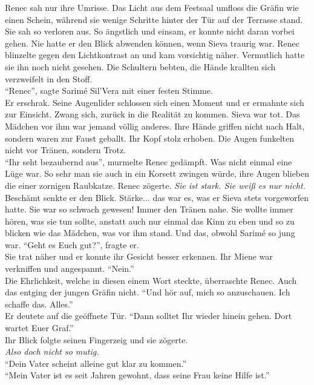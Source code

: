 Renec sah nur ihre Umrisse. Das Licht aus dem Festsaal umfloss die Gräfin wie einen Schein, während 
sie wenige Schritte hinter der Tür auf der Terrasse stand. Sie sah so verloren aus. So ängstlich 
und einsam, er konnte nicht daran vorbei gehen. Nie hatte er den Blick abwenden können, wenn Sieva 
traurig war. Renec blinzelte gegen den Lichtkontrast an und kam vorsichtig näher. Vermutlich hatte 
sie ihn noch nicht gesehen.  Die Schultern bebten, die Hände krallten sich verzweifelt in den Stoff. 
\\
``Renec'', sagte Sarimé Sil'Vera mit einer festen Stimme.\\
Er erschrak. Seine Augenlider schlossen sich einen Moment und er ermahnte sich zur Einsicht. 
Zwang sich, zurück in die Realität zu kommen. Sieva war tot. Das Mädchen vor ihm war jemand völlig 
anderes. Ihre Hände griffen nicht nach Halt, sondern waren zur Faust geballt. Ihr Kopf stolz 
erhoben. Die Augen funkelten nicht vor Tränen, sondern Trotz. \\
``Ihr seht bezaubernd aus'', murmelte Renec gedämpft. Was nicht einmal eine Lüge war. So sehr man 
sie auch in ein Korsett zwingen würde, ihre Augen blieben die einer zornigen Raubkatze. Renec 
zögerte. \textit{Sie ist stark. Sie weiß es nur nicht.}\\
Beschämt senkte er den Blick. Stärke... das war es, was er Sieva stets vorgeworfen hatte. Sie war 
so schwach gewesen! Immer den Tränen nahe. Sie wollte immer hören, was sie tun sollte, anstatt auch 
nur einmal das Kinn zu eben und so zu blicken wie das Mädchen, was vor ihm stand. Und das, obwohl 
Sarimé so jung war. ``Geht es Euch gut?'', fragte er.\\
Sie trat näher und er konnte ihr Gesicht besser erkennen. Ihr Miene war verkniffen und angespannt.
``Nein.''\\
Die Ehrlichkeit, welche in diesen einem Wort steckte, überraschte Renec. Auch das entging der 
jungen Gräfin nicht. ``Und hör auf, mich so anzuschauen. Ich schaffe das. Alles.''\\
Er deutete auf die geöffnete Tür. ``Dann solltet Ihr wieder hinein gehen. Dort wartet Euer Graf.''\\
Ihr Blick folgte seinen Fingerzeig und sie zögerte.\\
\textit{Also doch nicht so mutig.}\\
``Dein Vater scheint alleine gut klar zu kommen.''\\
``Mein Vater ist es seit Jahren gewohnt, dass seine Frau keine Hilfe ist.''\\

